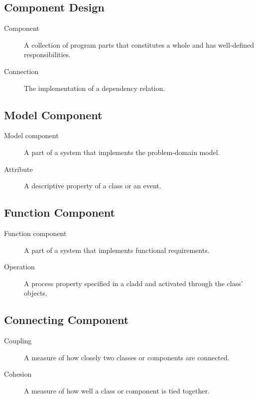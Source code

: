 \subsection{Component Design}
\begin{description}
    \item[Component] A collection of program parts that constitutes a whole and has well-defined responsibilities.
    \item[Connection] The implementation of a dependency relation.
\end{description}

\subsection{Model Component}
\begin{description}
    \item[Model component] A part of a system that implements the problem-domain model.
    \item[Attribute] A descriptive property of a class or an event.
\end{description}

\subsection{Function Component}
\begin{description}
    \item[Function component] A part of a system that implements functional requirements.
    \item[Operation] A process property specified in a cladd and activated through the class' objects.
\end{description}

\subsection{Connecting Component}
\begin{description}
    \item[Coupling] A measure of how closely two classes or components are connected.
    \item[Cohesion] A measure of how well a class or component is tied together.
\end{description}

